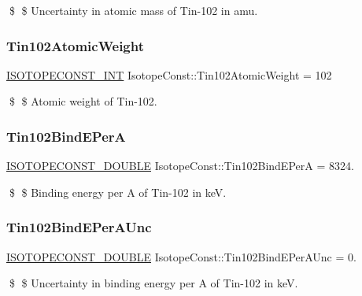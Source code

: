 \$ \$ Uncertainty in atomic mass of Tin-\/102 in amu. \mbox{\label{group___isotope_const-_tin-_sn102_ga4f99e99c763b225b3195700fd1d472d1}} 
\subsubsection{\texorpdfstring{Tin102\+Atomic\+Weight}{Tin102AtomicWeight}}
{\footnotesize\ttfamily \mbox{\hyperlink{group___isotope_const-_macros_ga5f18360b3e99483a35c32d789e62621c}{I\+S\+O\+T\+O\+P\+E\+C\+O\+N\+S\+T\+\_\+\+I\+NT}} Isotope\+Const\+::\+Tin102\+Atomic\+Weight = 102}

\$ \$ Atomic weight of Tin-\/102. \mbox{\label{group___isotope_const-_tin-_sn102_ga929870a7fc11ec154d561ef0fa28482c}} 
\subsubsection{\texorpdfstring{Tin102\+Bind\+E\+PerA}{Tin102BindEPerA}}
{\footnotesize\ttfamily \mbox{\hyperlink{group___isotope_const-_macros_ga8f45a7272ce02c0b4c65c44636ed719a}{I\+S\+O\+T\+O\+P\+E\+C\+O\+N\+S\+T\+\_\+\+D\+O\+U\+B\+LE}} Isotope\+Const\+::\+Tin102\+Bind\+E\+PerA = 8324.}

\$ \$ Binding energy per A of Tin-\/102 in keV. \mbox{\label{group___isotope_const-_tin-_sn102_ga6b2903544699183f0d2c0bdc07c6e97f}} 
\subsubsection{\texorpdfstring{Tin102\+Bind\+E\+Per\+A\+Unc}{Tin102BindEPerAUnc}}
{\footnotesize\ttfamily \mbox{\hyperlink{group___isotope_const-_macros_ga8f45a7272ce02c0b4c65c44636ed719a}{I\+S\+O\+T\+O\+P\+E\+C\+O\+N\+S\+T\+\_\+\+D\+O\+U\+B\+LE}} Isotope\+Const\+::\+Tin102\+Bind\+E\+Per\+A\+Unc = 0.}

\$ \$ Uncertainty in binding energy per A of Tin-\/102 in keV. \mbox{\label{group___isotope_const-_tin-_sn102_gabebd415dc7261bf5248c23cf47cc1034}} 
